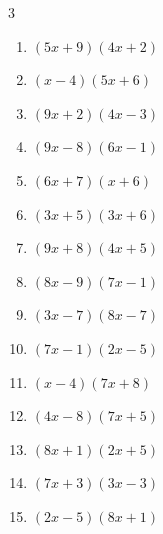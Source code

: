 \begin{multicols}{3}
\begin{enumerate}
  \item $(5x+9)(4x+2)$


  \item $(x-4)(5x+6)$


  \item $(9x+2)(4x-3)$


  \item $(9x-8)(6x-1)$


\columnbreak %

  \item $(6x+7)(x+6)$


  \item $(3x+5)(3x+6)$


  \item $(9x+8)(4x+5)$


  \item $(8x-9)(7x-1)$


  \item $(3x-7)(8x-7)$


  \item $(7x-1)(2x-5)$


  \item $(x-4)(7x+8)$


  \item $(4x-8)(7x+5)$


  \item $(8x+1)(2x+5)$


  \item $(7x+3)(3x-3)$


  \item $(2x-5)(8x+1)$


\end{enumerate}
\end{multicols}
